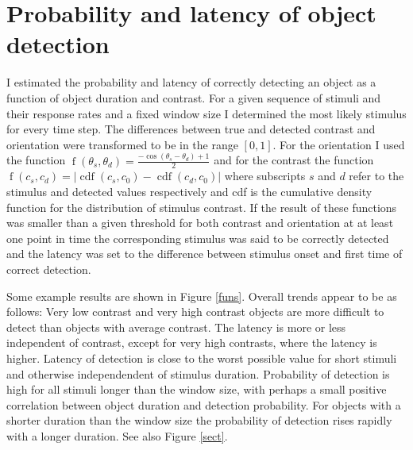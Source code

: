 \documentclass{scrartcl}
\begin{document}
\section{Probability and latency of object detection}
\label{plat}
I estimated the probability and latency of correctly detecting an object as a function of object duration and contrast. For a given sequence of stimuli and their response rates and a fixed window size I determined the most likely stimulus for every time step. The differences between true and detected contrast and orientation were transformed to be in the range $\left[0, 1\right]$. For the orientation I used the function $\operatorname{f}(\theta_s, \theta_d) = \frac{- \cos{(\theta_s - \theta_d)} + 1}{2}$ and for the contrast the function $\operatorname{f}(c_s, c_d) = \lvert \operatorname{cdf}(c_s, c_0) - \operatorname{cdf}(c_d, c_0) \rvert $ where subscripts $s$ and $d$ refer to the stimulus and detected values respectively and cdf is the cumulative density function for the distribution of stimulus contrast. If the result of these functions was smaller than a given threshold for both contrast and orientation at at least one point in time the corresponding stimulus was said to be correctly detected and the latency was set to the difference between stimulus onset and first time of correct detection.

Some example results are shown in Figure \ref{funs}. Overall trends appear to be as follows: Very low contrast and very high contrast objects are more difficult to detect than objects with average contrast. The latency is more or less independent of contrast, except for very high contrasts, where the latency is higher. Latency of detection is close to the worst possible value for short stimuli and otherwise independendent of stimulus duration. Probability of detection is high for all stimuli longer than the window size, with perhaps a small positive correlation between object duration and detection probability. For objects with a shorter duration than the window size the probability of detection rises rapidly with a longer duration. See also Figure \ref{sect}.

\end{document}
